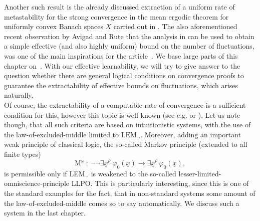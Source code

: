 Another such result is the already discussed extraction of a 
uniform rate of metastability for the strong convergence in the mean 
ergodic theorem for uniformly convex Banach spaces $X$ carried out in 
\cite{kohlenbachleustean09}. The also aforementioned recent
observation by Avigad and Rute \cite{Avigad/Rute} that the analysis 
in \cite{kohlenbachleustean09} can be used to obtain a simple effective (and 
also highly uniform) 
bound on the number of fluctuations, was one of the
main inspirations for the article~\cite{KS13}. We base
large parts of this chapter on~\cite{KS13}. With our effective learnability, we will try 
to give answer to the question whether there are general logical conditions on 
convergence proofs to guarantee the extractability of effective bounds 
on fluctuations, which arises naturally.\\
Of course, the extractability of 
a computable rate of convergence is a sufficient condition for this, however this
topic is well known (see e.g. \cite{Kohlenbach08} or \cite{GerKoh06}).
Let us note though, that all such criteria are based on intuitionistic
systems, with the use of the law-of-excluded-middle limited to $\mbox{LEM$_\neg$} $.
Moreover, adding an important weak principle of classical logic,
the so-called Markov principle (extended to all finite types)
\[ \mbox{M}^{\omega}\ :\ 
\neg\neg\exists \underline{x}^{\underline{\rho}} \ \varphi_0(\underline{x})\to 
\exists \underline{x}^{\underline{\rho}}\,\varphi_0(\underline{x}), \] 
is permissible only if LEM$_{\neg}$ is weakened to the so-called lesser-limited-omniscience-principle 
LLPO. This is particularly interesting, since this is one of the standard
examples for the fact, that in non-standard systems some amount of the law-of-excluded-middle comes so to say automatically. We discuss such a system in the last chapter.

